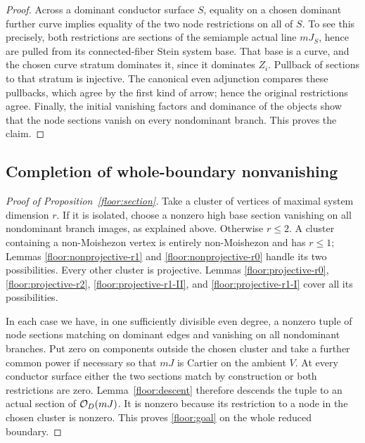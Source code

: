 \begin{proof}
Across a dominant conductor surface
$S$, equality on a chosen dominant
further curve implies equality of the
two node restrictions on all of $S$.
To see this precisely, both restrictions
are sections of the semiample actual
line $mJ_S$, hence are pulled from its
connected-fiber Stein system base.
That base is a curve, and the chosen
curve stratum dominates it, since it
dominates $Z_i$.  Pullback of sections
to that stratum is injective.  The
canonical even adjunction compares
these pullbacks, which agree by the
first kind of arrow; hence the original
restrictions agree.  Finally, the
initial vanishing factors and dominance
of the objects show that the node
sections vanish on every nondominant
branch.  This proves the claim.
\end{proof}

\subsection{Completion of whole-boundary nonvanishing}

\begin{proof}[Proof of Proposition~\ref{floor:section}]
Take a cluster of vertices of maximal system
dimension $r$.  If it is isolated, choose a
nonzero high base section vanishing on all
nondominant branch images, as explained
above.  Otherwise $r\le2$.  A cluster
containing a non-Moishezon vertex is entirely
non-Moishezon and has $r\le1$; Lemmas
\ref{floor:nonprojective-r1} and
\ref{floor:nonprojective-r0} handle its two
possibilities.  Every other cluster is
projective.  Lemmas
\ref{floor:projective-r0},
\ref{floor:projective-r2},
\ref{floor:projective-r1-II}, and
\ref{floor:projective-r1-I} cover all its
possibilities.

In each case we have, in one sufficiently
divisible even degree, a nonzero tuple of
node sections matching on dominant edges
and vanishing on all nondominant branches.
Put zero on components outside the chosen
cluster and take a further common power
if necessary so that $mJ$ is Cartier on
the ambient $V$.  At every conductor
surface either the two sections match
by construction or both restrictions
are zero.  Lemma~\ref{floor:descent}
therefore descends the tuple to an
actual section of $\mathcal{O}_D(mJ)$.  It is
nonzero because its restriction to a
node in the chosen cluster is nonzero.
This proves \eqref{floor:goal} on the
whole reduced boundary.
\end{proof}

